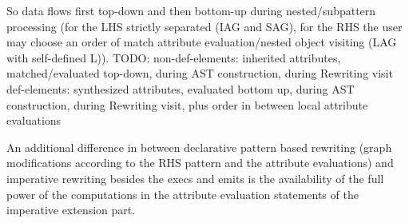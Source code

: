 So data flows first top-down and then bottom-up during nested/subpattern processing (for the LHS strictly separated (IAG and SAG), for the RHS the user may choose an order of match attribute evaluation/nested object visiting (LAG with self-defined L)).
TODO: non-def-elements: inherited attributes, matched/evaluated top-down, during AST construction, during Rewriting visit
def-elements: synthesized attributes, evaluated bottom up, during AST construction, during Rewriting visit, plus order in between local attribute evaluations

An additional difference in between declarative pattern based rewriting (graph modifications according to the RHS pattern and the attribute evaluations) and imperative rewriting besides the execs and emits is the availability of the full power of the computations in the attribute evaluation statements of the imperative extension part.


